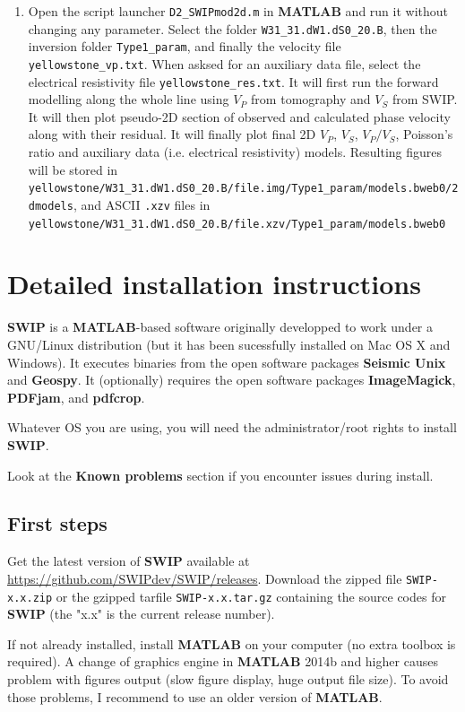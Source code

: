 \documentclass[twoside,a4paper]{article}
\def\SWIP{\textbf{SWIP}}
\def\SeismicUnix{\textbf{Seismic Unix}}
\def\Geopsy{\textbf{Geospy}}
\def\ImageMagick{\textbf{ImageMagick}}
\def\PDFjam{\textbf{PDFjam}}
\def\pdfcrop{\textbf{pdfcrop}}
\def\MATLAB{\textbf{MATLAB}}
\begin{document}
\begin{enumerate}[leftmargin=*]
\item Open the script launcher \verb|D2_SWIPmod2d.m| in {\MATLAB} and run it without changing any parameter. Select the folder \verb|W31_31.dW1.dS0_20.B|, then the inversion folder \verb|Type1_param|, and finally the velocity file \verb|yellowstone_vp.txt|. When asksed for an auxiliary data file, select the electrical resistivity file \verb|yellowstone_res.txt|. It will first run the forward modelling along the whole line using $V_P$ from tomography and $V_S$ from SWIP. It will then plot pseudo-2D section of observed and calculated phase velocity along with their residual. It will finally plot final 2D $V_P$, $V_S$, $V_P/V_S$, Poisson's ratio and auxiliary data (i.e. electrical resistivity) models. Resulting figures will be stored in \verb|yellowstone/W31_31.dW1.dS0_20.B/file.img/Type1_param/models.bweb0/2dmodels|, and ASCII \verb|.xzv| files in \verb|yellowstone/W31_31.dW1.dS0_20.B/file.xzv/Type1_param/models.bweb0|

\end{enumerate}

\newpage
\section{Detailed installation instructions}
\label{sec:detailedinstruc}
{\SWIP} is a \MATLAB-based software originally developped to work under a GNU/Linux distribution (but it has been sucessfully installed on Mac OS X and Windows). It executes binaries from the open software packages {\SeismicUnix} and {\Geopsy}. It (optionally) requires the open software packages {\ImageMagick}, {\PDFjam}, and {\pdfcrop}.

Whatever OS you are using, you will need the administrator/root rights to install {\SWIP}.

Look at the \textbf{Known problems} section if you encounter issues during install.

\subsection{First steps}
Get the latest version of {\SWIP} available at \url{https://github.com/SWIPdev/SWIP/releases}. Download the zipped file \verb|SWIP-x.x.zip| or the gzipped tarfile \verb|SWIP-x.x.tar.gz| containing the source codes for {\SWIP} (the "x.x" is the current release number).

If not already installed, install {\MATLAB} on your computer (no extra toolbox is required). A change of graphics engine in {\MATLAB} 2014b and higher causes problem with figures output (slow figure display, huge output file size). To avoid those problems, I recommend to use an older version of {\MATLAB}.
\end{document}
